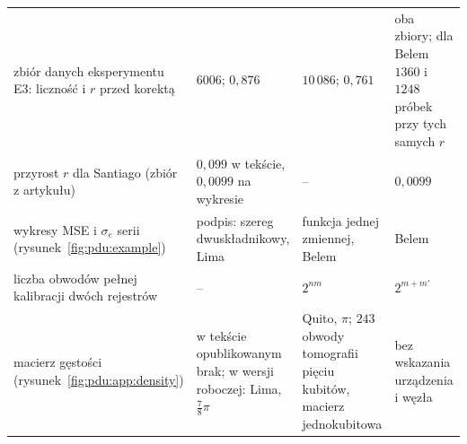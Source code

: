 \begin{table}[htbp]
\begin{tabular}{@{}>{\raggedright\arraybackslash}p{3.5cm}>{\raggedright\arraybackslash}p{3.9cm}>{\raggedright\arraybackslash}p{3.9cm}>{\raggedright\arraybackslash}p{3.3cm}@{}}
zbiór danych eksperymentu E3: liczność i $r$ przed korektą & $6006$; $0{,}876$ & $10\,086$; $0{,}761$ & oba zbiory; dla Belem $1360$ i $1248$ próbek przy tych samych $r$ \\
przyrost $r$ dla Santiago (zbiór z artykułu) & $0{,}099$ w tekście, $0{,}0099$ na wykresie & -- & $0{,}0099$ \\
wykresy MSE i $\sigma_e$ serii (rysunek~\ref{fig:pdu:example}) & podpis: szereg dwuskładnikowy, Lima & funkcja jednej zmiennej, Belem & Belem \\
liczba obwodów pełnej kalibracji dwóch rejestrów & -- & $2^{nm}$ & $2^{m+m'}$ \\
macierz gęstości (rysunek~\ref{fig:pdu:app:density}) & w tekście opublikowanym brak; w wersji roboczej: Lima, $\tfrac{7}{8}\pi$ & Quito, $\pi$; $243$ obwody tomografii pięciu kubitów, macierz jednokubitowa & bez wskazania urządzenia i węzła \\
\bottomrule
\end{tabular}
\end{table}

